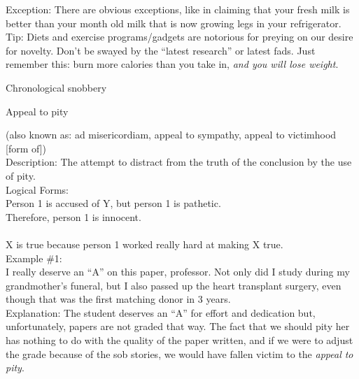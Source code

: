 \documentclass[a4paper,12pt,single,pdftex]{scrartcl}
\begin{document}
{    
      Exception: There are obvious exceptions, like in claiming that your fresh milk is better than your month old milk that is now growing legs in your refrigerator.
    \\

    
      Tip: Diets and exercise programs/gadgets are notorious for preying on our desire for novelty.  Don’t be swayed by the “latest research” or latest fads.  Just remember this: burn more calories than you take in, {\it and you will lose weight}.
    \\

  }


Chronological snobbery

Appeal to pity
    
      (also known as: ad misericordiam, appeal to sympathy, appeal to victimhood [form of])
    \\

  
    
      Description: The attempt to distract from the truth of the conclusion by the use of pity.
    \\

    
      Logical Forms:
    \\

    
      Person 1 is accused of Y, but person 1 is pathetic.
    \\

    
      Therefore, person 1 is innocent.
    \\

    
       
    \\

    
      X is true because person 1 worked really hard at making X true.
    \\

    
      Example \#1:
    \\

    
      I really deserve an “A” on this paper, professor.  Not only did I study during my grandmother’s funeral, but I also passed up the heart transplant surgery, even though that was the first matching donor in 3 years.
    \\

    
      Explanation: The student deserves an “A” for effort and dedication but, unfortunately, papers are not graded that way.  The fact that we should pity her has nothing to do with the quality of the paper written, and if we were to adjust the grade because of the sob stories, we would have fallen victim to the {\it appeal to pity}.
    \\
\end{document}
